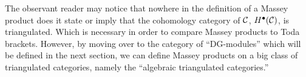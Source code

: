 \begin{remark}
    


\end{remark}

The observant reader may notice that nowhere in the definition of a Massey product does it state or imply that the cohomology category of \( {\mathcal{C}} \), \( H^\bullet({\mathcal{C}}) \), is triangulated. Which is necessary in order to compare Massey products to Toda brackets. However, by moving over to the category of ``DG-modules'' which will be defined in the next section, we can define Massey products on a big class of triangulated categories, namely the ``algebraic triangulated categories.''
